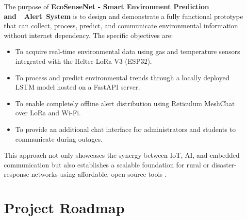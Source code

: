 The purpose of \textbf{EcoSenseNet - Smart Environment Prediction and  Alert System} is to design and demonstrate a fully functional prototype that can collect, process, predict, and communicate environmental information without internet dependency. The specific objectives are:
\begin{itemize}
    \item To acquire real-time environmental data using gas and temperature sensors integrated with the Heltec LoRa V3 (ESP32).
    \item To process and predict environmental trends through a locally deployed LSTM model hosted on a FastAPI server.
    \item To enable completely offline alert distribution using Reticulum MeshChat over LoRa and Wi-Fi.
    \item To provide an additional chat interface for administrators and students to communicate during outages.
\end{itemize}

This approach not only showcases the synergy between IoT, AI, and embedded communication but also establishes a scalable foundation for rural or disaster-response networks using affordable, open-source tools \cite{iot_smart_environment, lora_mesh_research}.

\section{Project Roadmap}

